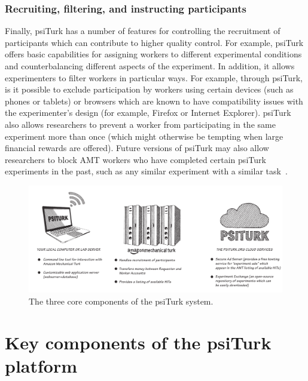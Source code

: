 \documentclass[twocolumn]{svjour3}          %
\newcommand{\psiturk}[0]{\textsf{psiTurk}}
\begin{document}


\subsubsection{Recruiting, filtering, and instructing participants}
Finally, \psiturk{} has a number of features for controlling the recruitment
of participants which can contribute to higher quality control.
For example, \psiturk{} offers basic capabilities for assigning workers to different experimental conditions 
and counterbalancing different aspects of the experiment.
In addition, it allows experimenters to filter workers in particular ways.  For example, through \psiturk{},
is it possible to exclude participation by workers using certain devices (such as phones or tablets) or browsers
which are known to have compatibility issues with the experimenter's design (for example,
Firefox or Internet Explorer).  \psiturk{} also allows researchers to prevent a worker from 
participating in the same experiment more than once (which might otherwise be tempting when
large financial rewards are offered).  Future versions of \psiturk{} may also allow researchers to 
block AMT workers who have completed certain \psiturk{} experiments in the past, such as
any similar experiment with a similar task~\citep[see][for a discussion about non-naivety amongst AMT workers]{chandler2014nonnaivete}.

\begin{figure}[tp]
\centering
\includegraphics[scale=.40]{figures/psiturk-components.pdf}
\caption{The three core components of the \psiturk{} system.  }
\label{fig:components}
\end{figure}


\section{Key components of the \psiturk{} platform}
\end{document}
